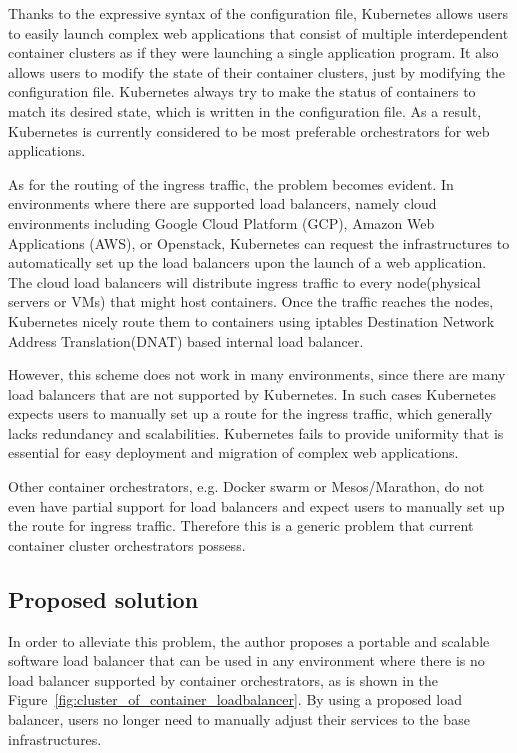 Thanks to the expressive syntax of the configuration file, Kubernetes allows users to easily launch complex web applications that consist of multiple interdependent container clusters as if they were launching a single application program.
It also allows users to modify the state of their container clusters, just by modifying the configuration file.
Kubernetes always try to make the status of containers to match its desired state, which is written in the configuration file.
As a result, Kubernetes is currently considered to be most preferable orchestrators for web applications.

As for the routing of the ingress traffic, the problem becomes evident.
In environments where there are supported load balancers, namely cloud environments including Google Cloud Platform (GCP), Amazon Web Applications (AWS), or Openstack, Kubernetes can request the infrastructures to automatically set up the load balancers upon the launch of a web application.
The cloud load balancers will distribute ingress traffic to every node(physical servers or VMs) that might host containers.
Once the traffic reaches the nodes, Kubernetes nicely route them to containers using iptables Destination Network Address Translation(DNAT) based internal load balancer.

However, this scheme does not work in many environments, since there are many load balancers that are not supported by Kubernetes.
In such cases Kubernetes expects users to manually set up a route for the ingress traffic, which generally lacks redundancy and scalabilities.
Kubernetes fails to provide uniformity that is essential for easy deployment and migration of complex web applications.

Other container orchestrators, e.g. Docker swarm or Mesos/Marathon, do not even have partial support for load balancers and expect users to manually set up the route for ingress traffic.
Therefore this is a generic problem that current container cluster orchestrators possess.

\subsection{Proposed solution}

In order to alleviate this problem, the author proposes a portable and scalable software load balancer that can be used in any environment where there is no load balancer supported by container orchestrators, as is shown in the Figure~\ref{fig:cluster_of_container_loadbalancer}.
By using a proposed load balancer, users no longer need to manually adjust their services to the base infrastructures.

